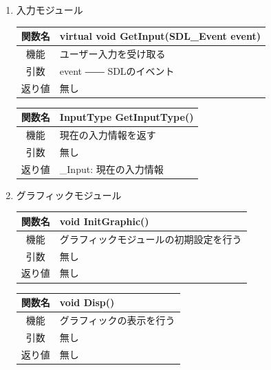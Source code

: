 \documentclass{jarticle}
\begin{document}
\begin{enumerate}
    \item 入力モジュール
    \begin{table}[h]
        \label{table:fanc_c4-1}
        \begin{center}
            \begin{tabular}{|c||p{30em}|}\hline
                関数名&virtual void GetInput(SDL\_Event event)\\\hline
                機能&ユーザー入力を受け取る\\
                引数&event ―― SDLのイベント\\
                返り値&無し\\\hline
            \end{tabular}
        \end{center}
    \end{table}
    \begin{table}[h]
        \label{table:fanc_c4-2}
        \begin{center}
            \begin{tabular}{|c||p{30em}|}\hline
                関数名&InputType GetInputType()\\\hline
                機能&現在の入力情報を返す\\
                引数&無し\\
                返り値&\_Input: 現在の入力情報\\\hline
            \end{tabular}
        \end{center}
    \end{table}
    \item グラフィックモジュール
    \begin{table}[h]
        \label{table:fanc_c5-1}
        \begin{center}
            \begin{tabular}{|c||p{30em}|}\hline
                関数名&void InitGraphic()\\\hline
                機能&グラフィックモジュールの初期設定を行う\\
                引数&無し\\
                返り値&無し\\\hline
            \end{tabular}
        \end{center}
    \end{table}
    \begin{table}[h]
        \label{table:fanc_c5-1}
        \begin{center}
            \begin{tabular}{|c||p{30em}|}\hline
                関数名&void Disp()\\\hline
                機能&グラフィックの表示を行う\\
                引数&無し\\
                返り値&無し\\\hline
            \end{tabular}
        \end{center}
    \end{table}

\end{enumerate}
\end{document}
